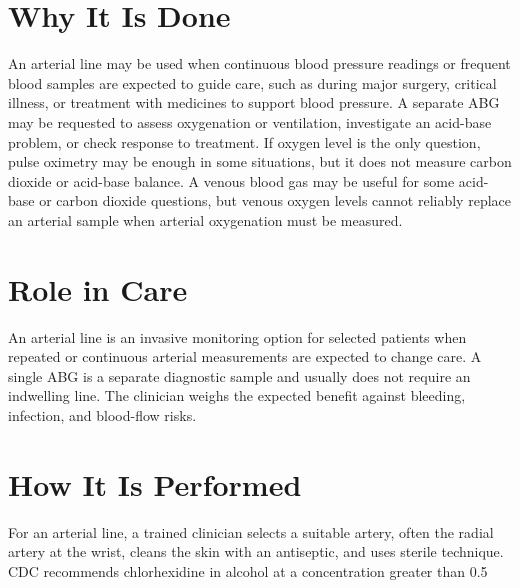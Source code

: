 \section*{Why It Is Done}
An arterial line may be used when continuous blood pressure readings or frequent blood samples are expected to guide care, such as during major surgery, critical illness, or treatment with medicines to support blood pressure. A separate ABG may be requested to assess oxygenation or ventilation, investigate an acid-base problem, or check response to treatment. If oxygen level is the only question, pulse oximetry may be enough in some situations, but it does not measure carbon dioxide or acid-base balance. A venous blood gas may be useful for some acid-base or carbon dioxide questions, but venous oxygen levels cannot reliably replace an arterial sample when arterial oxygenation must be measured.

\section*{Role in Care}
An arterial line is an invasive monitoring option for selected patients when repeated or continuous arterial measurements are expected to change care. A single ABG is a separate diagnostic sample and usually does not require an indwelling line. The clinician weighs the expected benefit against bleeding, infection, and blood-flow risks.

\section*{How It Is Performed}
For an arterial line, a trained clinician selects a suitable artery, often the radial artery at the wrist, cleans the skin with an antiseptic, and uses sterile technique. CDC recommends chlorhexidine in alcohol at a concentration greater than 0.5%

